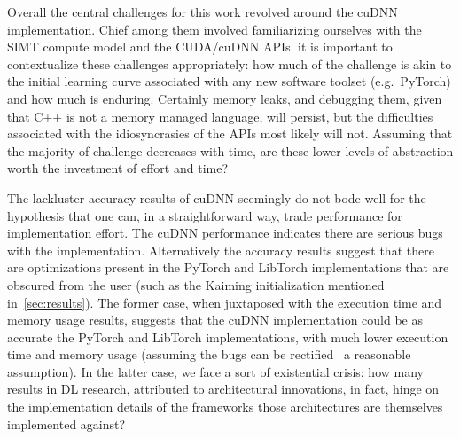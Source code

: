 
Overall the central challenges for this work revolved around the cuDNN implementation.
Chief among them involved familiarizing ourselves with the SIMT compute model and the CUDA/cuDNN APIs.
it is important to contextualize these challenges appropriately: how much of the challenge is akin to the initial learning curve associated with any new software toolset (e.g.\ PyTorch) and how much is enduring.
Certainly memory leaks, and debugging them, given that C++ is not a memory managed language, will persist, but the difficulties associated with the idiosyncrasies of the APIs most likely will not.
Assuming that the majority of challenge decreases with time, are these lower levels of abstraction worth the investment of effort and time?

The lackluster accuracy results of cuDNN seemingly do not bode well for the hypothesis that one can, in a straightforward way, trade performance for implementation effort.
The cuDNN performance indicates there are serious bugs with the implementation.
Alternatively the accuracy results suggest that there are optimizations present in the PyTorch and LibTorch implementations that are obscured from the user (such as the Kaiming initialization mentioned in~\cref{sec:results}).
The former case, when juxtaposed with the execution time and memory usage results, suggests that the cuDNN implementation could be as accurate the PyTorch and LibTorch implementations, with much lower execution time and memory usage (assuming the bugs can be rectified \textemdash\ a reasonable assumption).
In the latter case, we face a sort of existential crisis: how many results in DL research, attributed to architectural innovations, in fact, hinge on the implementation details of the frameworks those architectures are themselves implemented against?

